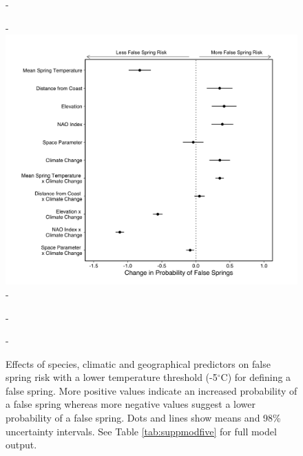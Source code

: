 \documentclass{article}\usepackage[]{graphicx}\usepackage[]{color}
\begin{document}
  
  {\begin{figure} [H]
  -\begin{center}
  -\includegraphics[width=12cm]{..//..//analyses/figures/model_output_98_fivelong.png}
  -\caption{Effects of species, climatic and geographical predictors on false spring risk with a lower temperature threshold (-5$^{\circ}$C) for defining a false spring. More positive values indicate an increased probability of a false spring whereas more negative values suggest a lower probability of a false spring. Dots and lines show means and 98\% uncertainty intervals. See Table \ref{tab:suppmodfive} for full model output. }\label{fig:five}
  -\end{center}
  -\end{figure}}
  
\end{document}
